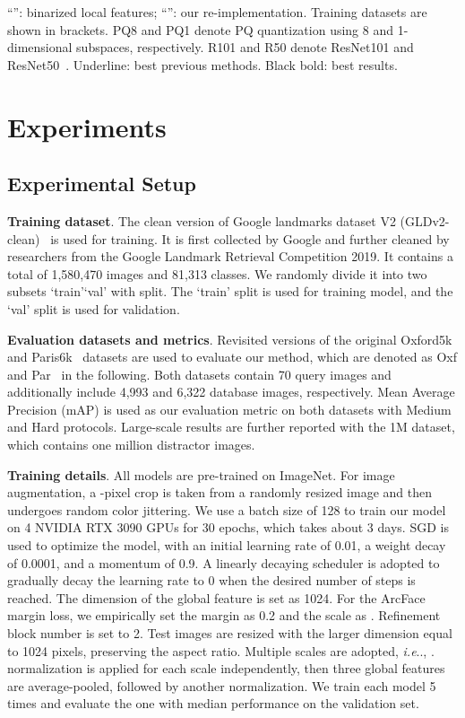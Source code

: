 \documentclass[letterpaper]{article} \usepackage{aaai22}  \usepackage{times}  \usepackage{helvet}  \usepackage{courier}  \usepackage[hyphens]{url}  \usepackage{graphicx} \urlstyle{rm} \def\UrlFont{\rm}  \usepackage{natbib}  \usepackage{caption} \DeclareCaptionStyle{ruled}{labelfont=normalfont,labelsep=colon,strut=off} \frenchspacing  \setlength{\pdfpagewidth}{8.5in}  \setlength{\pdfpageheight}{11in}  \usepackage{algorithm}
\makeatletter
\DeclareRobustCommand\onedot{\futurelet\@let@token\@onedot}
\def\@onedot{\ifx\@let@token.\else.\null\fi\xspace}
\def\ie{\emph{i.e}\onedot} \def\Ie{\emph{I.e}\onedot}
\makeatother
\begin{document}
\begin{table*}[h]
{		``'': binarized local features; ``'': our re-implementation. 
		Training datasets are shown in brackets. PQ8 and PQ1 denote PQ quantization using 8 and 1-dimensional subspaces, respectively. R101 and R50 denote ResNet101 and ResNet50~\cite{He_2016_CVPR}.
		Underline: best previous methods. 
		Black bold: best results.}
	\label{tab:state-of-the-art}
\end{table*}

\section{Experiments} \label{sec:experiments}
\subsection{Experimental Setup}
\noindent\textbf{Training dataset}. 
The clean version of Google landmarks dataset V2 (GLDv2-clean)~\cite{weyand2020google} is used for training. 
It is first collected by Google and further cleaned by researchers from the Google Landmark Retrieval Competition 2019. 
It contains a total of 1,580,470 images and 81,313 classes. 
We randomly divide it into two subsets `train’`val’ with  split.
The `train’ split is used for training model, and the `val’ split is used for validation.

\noindent\textbf{Evaluation datasets and metrics}. 
Revisited versions of the original Oxford5k~\cite{philbin2007object} and Paris6k~\cite{philbin2008lost} datasets are used to evaluate our method, which are denoted as Oxf and Par~\cite{radenovic2018revisiting} in the following. 
Both datasets contain 70 query images and additionally include 4,993 and 6,322 database images, respectively.
Mean Average Precision (mAP) is used as our evaluation metric on both datasets with Medium and Hard protocols.
Large-scale results are further reported with the 1M dataset, which contains one million distractor images.

\noindent\textbf{Training details}. 
All models are pre-trained on ImageNet.
For image augmentation, a -pixel crop is taken from a randomly resized image and then undergoes random color jittering.
We use a batch size of 128 to train our model on 4 NVIDIA RTX 3090 GPUs for 30 epochs, which takes about 3 days.
SGD is used to optimize the model, with an initial learning rate of 0.01, a weight decay of 0.0001, and a momentum of 0.9. 
A linearly decaying scheduler is adopted to gradually decay the learning rate to 0 when the desired number of steps is reached.
The dimension  of the global feature is set as 1024.
For the ArcFace margin loss, we empirically set the margin  as 0.2 and the
scale  as . Refinement block number  is set to 2. Test images are resized with the larger dimension equal to 1024 pixels, preserving the aspect ratio. Multiple scales are adopted, \ie, .  normalization is applied for each scale independently, then three global features are average-pooled, followed by another  normalization. We train each model 5 times and evaluate the one with median performance on the validation set.
\end{document}
